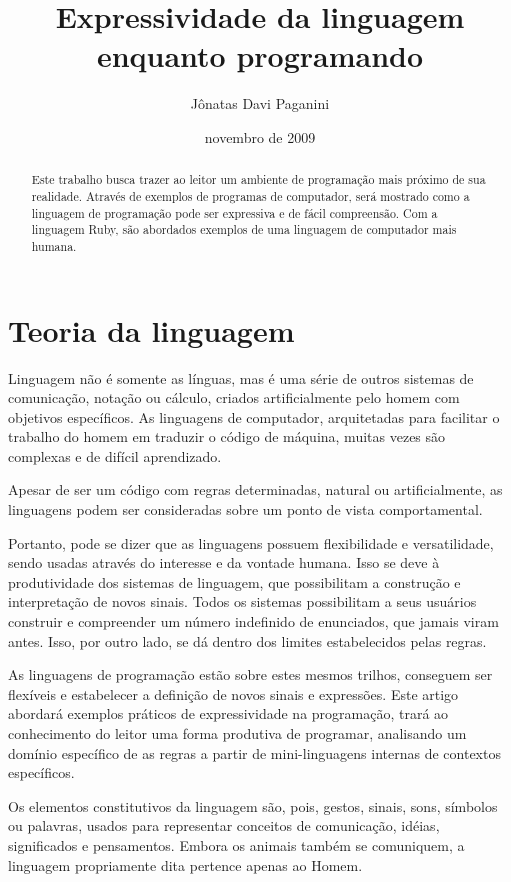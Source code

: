\documentclass[espaco=simples,appendix=Name]{abnt}
\title{Expressividade da linguagem enquanto programando}
\author{Jônatas Davi Paganini}
\date{novembro de 2009}
\begin{document}
\maketitle
\begin{abstract}
Este trabalho busca trazer ao leitor um ambiente de programação mais próximo de sua realidade. Através de exemplos de programas de computador, será mostrado como a linguagem de programação pode ser expressiva e de fácil compreensão. Com a linguagem Ruby, são abordados exemplos de uma linguagem de computador mais humana.
\end{abstract}


\chapter{Teoria da linguagem}



Linguagem não é somente as línguas, mas é uma série de outros sistemas de comunicação, notação ou cálculo, criados artificialmente pelo homem com objetivos específicos. As linguagens de computador, arquitetadas para facilitar o trabalho do homem em traduzir o código de máquina, muitas vezes são complexas e de difícil aprendizado.

Apesar de ser um código com regras determinadas, natural ou artificialmente, as linguagens podem ser consideradas sobre um ponto de vista comportamental. \cite{linguagemLinguistica}

Portanto, pode se dizer que as linguagens possuem flexibilidade e versatilidade, sendo usadas através do interesse e da vontade humana. Isso se deve à produtividade dos sistemas de linguagem, que possibilitam a construção e interpretação de novos sinais. Todos os sistemas possibilitam a seus usuários construir e compreender um número indefinido de enunciados, que jamais viram antes. Isso, por outro lado, se dá dentro dos limites estabelecidos pelas regras.

As linguagens de programação estão sobre estes mesmos trilhos, conseguem ser flexíveis e estabelecer a definição de novos sinais e expressões. Este artigo abordará exemplos práticos de expressividade na programação, trará ao conhecimento do leitor uma forma produtiva de programar, analisando um domínio específico de as regras a partir de mini-linguagens internas de contextos específicos.


Os elementos constitutivos da linguagem são, pois, gestos, sinais, sons, símbolos ou palavras, usados para representar conceitos de comunicação, idéias, significados e pensamentos. Embora os animais também se comuniquem, a linguagem propriamente dita pertence apenas ao Homem. \cite{wikiLinguagem}
\end{document}
